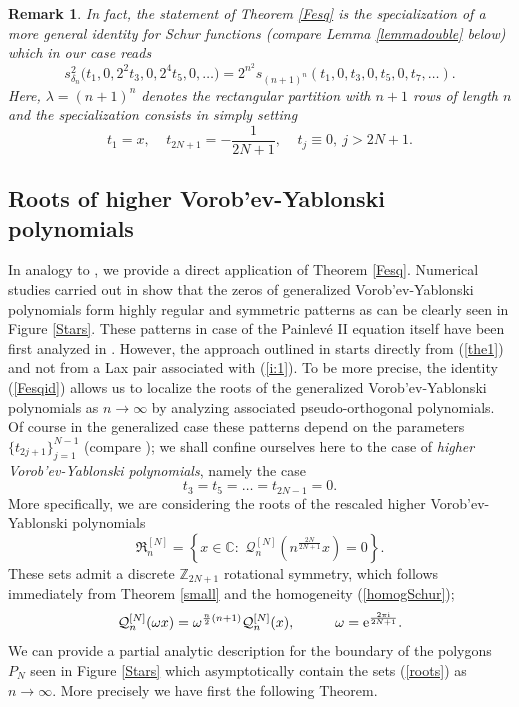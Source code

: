 \documentclass[10pt,reqno,oneside]{amsart}
\newcommand{\im}{\mathrm{i}}
\numberwithin{equation}{section}
\newtheorem{remark}[theo]{Remark}
\def\le{\left}
\def\ri{\right}
\def\br{\begin{remark}}
\def\er{\end{remark}}
\def\be{\begin{equation}}
\def\ee{\end{equation}}
\def\Z{{\mathbb Z}}
\def\Roots{\mathfrak R}
\def\eqref#1{(\ref{#1})}
\begin{document}
\br
In fact, the statement of Theorem \ref{Fesq} is the specialization of a more general identity for Schur functions (compare Lemma \ref{lemmadouble} below) which in our case reads 
\be
	s_{\delta_n}^2\big(t_1,0,{2^2}t_3,0,{2^4}t_5,0,\ldots\big)= 
 {2^{n^2}}s_{(n+1)^{n}}\left(t_1,0,t_3,0,t_5,0,t_7,\ldots\right). 
\ee 
Here, $\lambda=(n+1)^n$ denotes the rectangular partition with $n+1$ rows of length $n$ and the specialization consists in simply setting
\begin{equation*}
	t_1=x,\ \ \ \ \ t_{2N+1}=-\frac{1}{2N+1},\ \ \ \ \ t_j\equiv 0,\ j>2N+1.
\end{equation*}
\er
\subsection{Roots of higher Vorob'ev-Yablonski polynomials}
In analogy to \cite{BB}, we provide a direct application of Theorem \ref{Fesq}. Numerical studies carried out in \cite{KNFH,CM,DK2} show that the zeros of generalized Vorob'ev-Yablonski polynomials form highly regular and symmetric patterns as can be clearly seen in Figure \ref{Stars}. These patterns in case of the Painlev\'e II equation itself have been first analyzed in \cite{BuM1,BuM2}. However, the approach outlined in \cite{BB} starts directly from \eqref{the1} and not from a Lax pair associated with \eqref{i:1}. To be more precise, the identity \eqref{Fesqid} allows us to localize the roots of  the generalized  Vorob'ev-Yablonski polynomials as $n\to\infty$  by analyzing associated pseudo-orthogonal polynomials. Of course in the generalized case these patterns depend on the parameters $\{t_{2j+1}\}_{j=1}^{N-1}$ (compare \cite{DK2}); we shall confine ourselves here to the case of {\em higher Vorob'ev-Yablonski polynomials}, namely the case 
\begin{equation}
\label{higher}
	t_3=t_5=\ldots=t_{2N-1}=0.
\end{equation}
More specifically, we are considering the roots of the rescaled higher Vorob'ev-Yablonski polynomials 
\be\label{roots}
\Roots_n^{[N]} = \le\{
x\in\mathbb{C}:\,\,\mathcal{Q}_n^{[N]}\le(n^{\frac {2N}{2N+1}} x \ri) =0
\ri \}.
\ee
These sets admit a discrete $\Z_{2N+1}$ rotational symmetry, which follows immediately from Theorem \ref{small} and the homogeneity \eqref{homogSchur};
\be
\mathcal{Q}_{n}^{[N]}( \omega x)= \omega^{\frac {n}{2}(n+1)} \mathcal{Q}_n^{[N]}(x),\hspace{1cm}\omega= {\rm e}^{\frac {2\pi\im}{2N+1}}.
\ee
We can provide a partial  analytic description for the boundary of the polygons $P_N$ seen in Figure \ref{Stars} which asymptotically contain the sets \eqref{roots} as $n\to\infty$. More precisely we have first the following Theorem.
\end{document}
